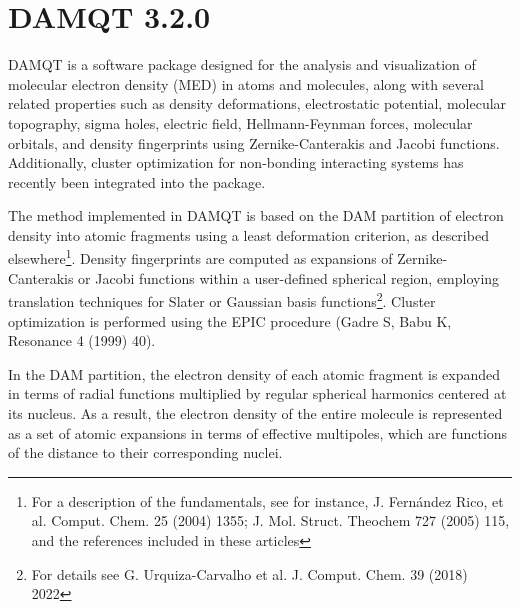 \documentclass[10pt]{article}
\begin{document}
\newenvironment{rcase}{
\left.\begin{aligned}}
  {\end{aligned}\right\rbrace
}
\newenvironment{lcase}{
\left\lbrace\begin{aligned}}
  {\end{aligned}\right.
}

\maketitle
{}

\newpage

\tableofcontents


\pagebreak

\section*{DAMQT 3.2.0 \label{sec:0}}
DAMQT is a software package designed for the analysis and visualization of molecular electron density (MED) in atoms and molecules, along with several related properties such as density deformations, electrostatic potential, molecular topography, sigma holes, electric field, Hellmann-Feynman forces, molecular orbitals, and density fingerprints using Zernike-Canterakis and Jacobi functions. Additionally, cluster optimization for non-bonding interacting systems has recently been integrated into the package.

The method implemented in DAMQT is based on the DAM partition of electron density into atomic fragments using a least deformation criterion, as described elsewhere\footnote{For a description of the
fundamentals, see for instance, J. Fern\'andez Rico, et al. Comput. Chem. 25
(2004) 1355; J. Mol. Struct. Theochem 727 (2005) 115, and the references
included in these articles}. Density fingerprints are computed as expansions of Zernike-Canterakis or Jacobi functions within a user-defined spherical region, employing translation techniques for Slater or Gaussian basis functions\footnote{For details see G. Urquiza-Carvalho et al. J. Comput. Chem. 39 (2018) 2022}. Cluster optimization is performed using the EPIC procedure (Gadre S, Babu K, Resonance 4 (1999) 40).

In the DAM partition, the electron density of each atomic fragment is expanded in terms of radial functions multiplied by regular spherical harmonics centered at its nucleus. As a result, the electron density of the entire molecule is represented as a set of atomic expansions in terms of effective multipoles, which are functions of the distance to their corresponding nuclei.
\end{document}
